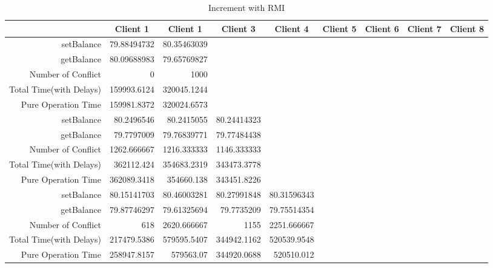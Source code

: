 \begin{landscape}
\begin{table}[htbp]
\scriptsize
  \centering
  \caption{Increment with RMI}
    \begin{tabular}{rrrrrrrrr}
    \toprule
          & \multicolumn{1}{c}{Client 1} & \multicolumn{1}{c}{Client 1} & \multicolumn{1}{c}{Client 3} & \multicolumn{1}{c}{Client 4} & \multicolumn{1}{c}{Client 5} & \multicolumn{1}{c}{Client 6} & \multicolumn{1}{c}{Client 7} & \multicolumn{1}{c}{Client 8} \\
    \midrule
    setBalance & 79.88494732 & 80.35463039 &       &       &       &       &       &  \\
    getBalance & 80.09688983 & 79.65769827 &       &       &       &       &       &  \\
    Number of Conflict & 0     & 1000  &       &       &       &       &       &  \\
    Total Time(with Delays) & 159993.6124 & 320045.1244 &       &       &       &       &       &  \\
\cline{1-9}    
    Pure Operation Time & 159981.8372 & 320024.6573 &       &       &       &       &       &  \\
    setBalance & 80.2496546 & 80.2415055 & 80.24414323 &       &       &       &       &  \\
    getBalance & 79.7797009 & 79.76839771 & 79.77484438 &       &       &       &       &  \\
    Number of Conflict & 1262.666667 & 1216.333333 & 1146.333333 &       &       &       &       &  \\
    Total Time(with Delays) & 362112.424 & 354683.2319 & 343473.3778 &       &       &       &       &  \\
    Pure Operation Time & 362089.3418 & 354660.138 & 343451.8226 &       &       &       &       &  \\
\cline{1-9}    
    setBalance & 80.15141703 & 80.46003281 & 80.27991848 & 80.31596343 &       &       &       &  \\
    getBalance & 79.87746297 & 79.61325694 & 79.7735209 & 79.75514354 &       &       &       &  \\
    Number of Conflict & 618   & 2620.666667 & 1155  & 2251.666667 &       &       &       &  \\
    Total Time(with Delays) & 217479.5386 & 579595.5407 & 344942.1162 & 520539.9548 &       &       &       &  \\
    Pure Operation Time & 258947.8157 & 579563.07 & 344920.0688 & 520510.012 &       &       &       &  \\

\end{tabular}
\end{table}
\end{landscape}
